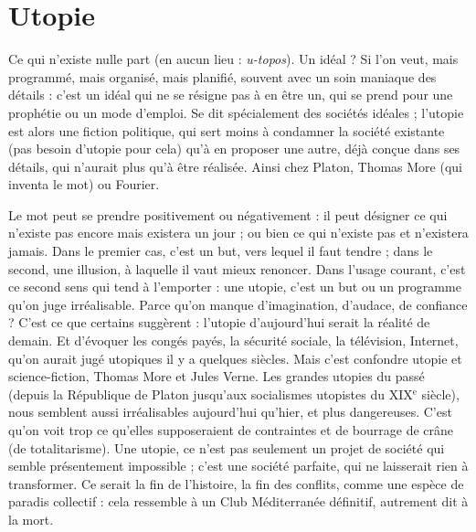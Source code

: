 \section{Utopie}
Ce qui n’existe nulle part (en aucun lieu : {\it u-topos}). Un idéal ? Si
l’on veut, mais programmé, mais organisé, mais planifié, souvent
avec un soin maniaque des détails : c’est un idéal qui ne se résigne pas à en être
un, qui se prend pour une prophétie ou un mode d’emploi. Se dit spécialement
des sociétés idéales ; l’utopie est alors une fiction politique, qui sert moins à
condamner la société existante (pas besoin d’utopie pour cela) qu’à en proposer
une autre, déjà conçue dans ses détails, qui n’aurait plus qu’à être réalisée. Ainsi
chez Platon, Thomas More (qui inventa le mot) ou Fourier.

Le mot peut se prendre positivement ou négativement : il peut désigner ce
qui n’existe pas encore mais existera un jour ; ou bien ce qui n’existe pas et
n’existera jamais. Dans le premier cas, c’est un but, vers lequel il faut tendre ;
dans le second, une illusion, à laquelle il vaut mieux renoncer. Dans l’usage
courant, c’est ce second sens qui tend à l'emporter : une utopie, c’est un but ou
un programme qu'on juge irréalisable. Parce qu’on manque d’imagination,
d’audace, de confiance ? C’est ce que certains suggèrent : l'utopie d’aujourd’hui
serait la réalité de demain. Et d’évoquer les congés payés, la sécurité sociale, la
télévision, Internet, qu’on aurait jugé utopiques il y a quelques siècles. Mais
c’est confondre utopie et science-fiction, Thomas More et Jules Verne. Les
grandes utopies du passé (depuis la République de Platon jusqu’aux socialismes
utopistes du {\footnotesize XIX$^\text{e}$} siècle), nous semblent aussi irréalisables aujourd’hui qu’hier,
et plus dangereuses. C’est qu’on voit trop ce qu’elles supposeraient de
contraintes et de bourrage de crâne (de totalitarisme). Une utopie, ce n’est pas
seulement un projet de société qui semble présentement impossible ; c’est une
société parfaite, qui ne laisserait rien à transformer. Ce serait la fin de l’histoire,
la fin des conflits, comme une espèce de paradis collectif : cela ressemble à un
Club Méditerranée définitif, autrement dit à la mort.

